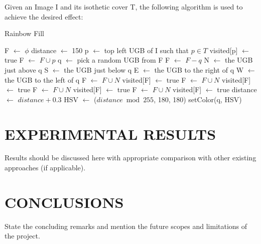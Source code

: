 \documentclass[12pt]{article}
\begin{document}
Given an Image I and its isothetic cover T, the following algorithm is used to achieve the desired effect:
\begin{algorithm}
\emph{}\caption{Rainbow Fill}
	\begin{algorithmic}[1]
	\State F $\longleftarrow$ $\phi$
	\State distance $\longleftarrow$ 150
	\State p $\longleftarrow$ top left UGB of I such that $p \in T$
	\State visited[p] $\longleftarrow$ true
	\State F $\longleftarrow$ $F \cup p $
		\State q $\longleftarrow$ pick a random UGB from F
		\State F $\longleftarrow$ $F - q$
		\State N $\longleftarrow$ the UGB just above q
		\State S $\longleftarrow$ the UGB just below q
		\State E $\longleftarrow$ the UGB to the right of q
		\State W $\longleftarrow$ the UGB to the left of q
			\State F $\longleftarrow$ $F \cup N$
			\State visited[F] $\longleftarrow$ true 
		\EndIf
			\State F $\longleftarrow$ $F \cup N$
			\State visited[F] $\longleftarrow$ true 
		\EndIf
			\State F $\longleftarrow$ $F \cup N$
			\State visited[F] $\longleftarrow$ true 
		\EndIf
			\State F $\longleftarrow$ $F \cup N$
			\State visited[F] $\longleftarrow$ true 
		\EndIf
		\State distance $\longleftarrow$ $distance+0.3$
		\State HSV $\longleftarrow$ ($distance \bmod 255$, 180, 180)
		\State setColor(q, HSV)
	\EndWhile
	\EndProcedure
	\end{algorithmic}
\end{algorithm}

\newpage




\section{EXPERIMENTAL RESULTS}
Results should be discussed here with appropriate comparison with other existing approaches (if applicable).




\newpage




\section{CONCLUSIONS}
State the concluding remarks and mention the future scopes and limitations of the project.
\end{document}
